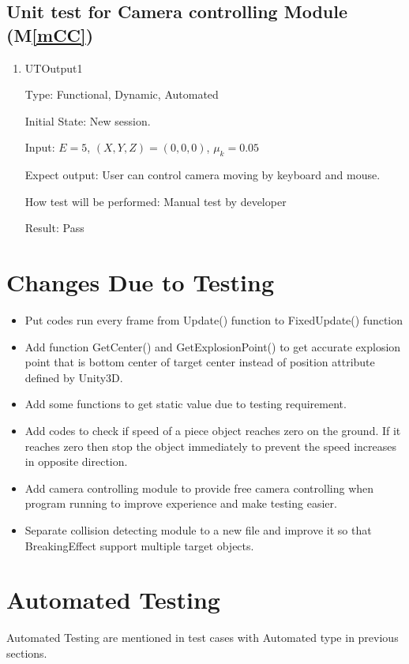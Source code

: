 \documentclass[12pt, titlepage]{article}
\newcommand{\mref}[1]{M\ref{#1}}
\begin{document}
\subsection{Unit test for Camera controlling Module (\mref{mCC})}
\label{Sec_UmCC}
\begin{enumerate}
	
	\item{UTOutput1\\}
	
	Type: Functional, Dynamic, Automated
	
	Initial State: New session.
	
	Input: $E = 5$, $(X,Y,Z) = (0,0,0)$, $\mu_{k} = 0.05$
	
	Expect output: User can control camera moving by keyboard and mouse.
	
	How test will be performed: Manual test by developer
	
	Result: Pass
\end{enumerate}


\section{Changes Due to Testing}

\begin{itemize}	
	\item Put codes run every frame from Update() function to FixedUpdate() function
	\item  Add function GetCenter() and GetExplosionPoint() to get accurate explosion point that is bottom center of target center instead of position attribute defined by Unity3D.
	\item Add some functions to get static value due to testing requirement.
	\item Add codes to check if speed of a piece object reaches zero on the ground. If it reaches zero then stop the object immediately to prevent the speed increases in opposite direction.
	\item Add camera controlling module to provide free camera controlling when program running to improve experience and make testing easier.
	\item Separate collision detecting module to a new file and improve it so that BreakingEffect support multiple target objects.  
\end{itemize}	
	
\section{Automated Testing}
	Automated Testing are mentioned in test cases with Automated type in previous sections.
\end{document}

